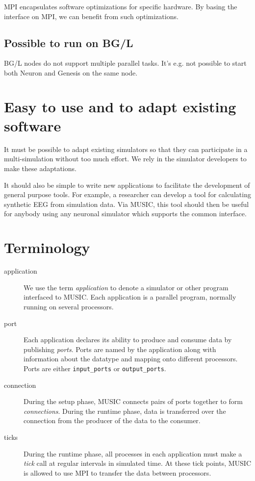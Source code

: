 \documentclass[a4paper]{report}
\begin{document}
MPI encapsulates software optimizations for specific hardware.  By
basing the interface on MPI, we can benefit from such optimizations.


\subsection{Possible to run on BG/L}

BG/L nodes do not support multiple parallel tasks.  It's e.g. not
possible to start both Neuron and Genesis on the same node.


\section{Easy to use and to adapt existing software}

It must be possible to adapt existing simulators so that they can
participate in a multi-simulation without too much effort.  We rely in
the simulator developers to make these adaptations.

It should also be simple to write new applications to facilitate the
development of general purpose tools.  For example, a researcher can
develop a tool for calculating synthetic EEG from simulation data.
Via MUSIC, this tool should then be useful for anybody using any
neuronal simulator which supports the common interface.


\section{Terminology}

\begin{description}
\item[application] We use the term \emph{application} to denote a
  simulator or other program interfaced to MUSIC.  Each application is
  a parallel program, normally running on several processors.

\item[port] Each application declares its ability to
  produce and consume data by publishing \emph{ports}.  Ports are
  named by the application along with information about the datatype
  and mapping onto different processors.  Ports are either
\verb|input_ports| or \verb|output_ports|.

\item[connection] During the setup phase, MUSIC connects pairs of ports
  together to form \emph{connections}.  During the runtime phase, data is
  transferred over the connection from the producer of the data to the
  consumer.

\item[ticks] During the runtime phase, all processes in each
  application must make a \emph{tick} call at regular intervals in
  simulated time.  At these tick points, MUSIC is allowed to use MPI
  to transfer the data between processors.
\end{description}
\end{document}
